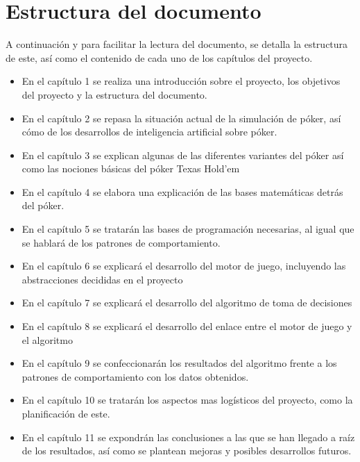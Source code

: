\section{Estructura del documento}

A continuación y para facilitar la lectura del documento, se detalla la estructura de este, así como el contenido de cada uno de los capítulos del proyecto.

\begin{itemize}
\item En el capítulo 1 se realiza una introducción sobre el proyecto, los objetivos del proyecto y la estructura del documento.
\item En el capítulo 2 se repasa la situación actual de la simulación de póker, así cómo de los desarrollos de inteligencia artificial sobre póker.
\item En el capítulo 3 se explican algunas de las diferentes variantes del póker así como las nociones básicas del póker Texas Hold'em
\item En el capítulo 4 se elabora una explicación de las bases matemáticas detrás del póker.
\item En el capítulo 5 se tratarán las bases de programación necesarias, al igual que se hablará de los patrones de comportamiento.
\item En el capítulo 6 se explicará el desarrollo del motor de juego, incluyendo las abstracciones decididas en el proyecto
\item En el capítulo 7 se explicará el desarrollo del algoritmo de toma de decisiones
\item En el capítulo 8 se explicará el desarrollo del enlace entre el motor de juego y el algoritmo
\item En el capítulo 9 se confeccionarán los resultados del algoritmo frente a los patrones de comportamiento con los datos obtenidos.
\item En el capítulo 10 se tratarán los aspectos mas logísticos del proyecto, como la planificación de este.
\item En el capítulo 11 se expondrán las conclusiones a las que se han llegado a raíz de los resultados, así como se plantean mejoras y posibles desarrollos futuros.
\end{itemize}
